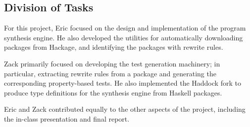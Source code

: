 \begin{appendix}
  \section{Division of Tasks}
  For this project, Eric focused on the design and implementation of the program
synthesis engine. He also developed the utilities for automatically downloading
packages from Hackage, and identifying the packages with rewrite rules.

Zack primarily focused on developing the test generation machinery; in
particular, extracting rewrite rules from a package and generating the
corresponding property-based tests. He also implemented the Haddock fork to
produce type definitions for the synthesis engine from Haskell packages.

Eric and Zack contributed equally to the other aspects of the project, including
the in-class presentation and final report.
\end{appendix}
